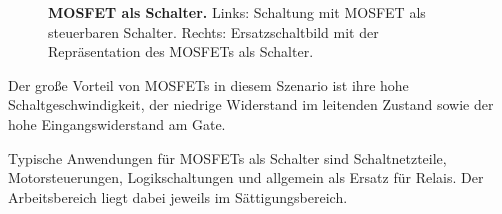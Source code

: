 {\begin{figure}[H]
    \caption{\textbf{MOSFET als Schalter.} Links: Schaltung mit MOSFET als steuerbaren Schalter. 
    Rechts: Ersatzschaltbild mit der Repräsentation des MOSFETs als Schalter.}  
    \label{fig:MOSFETAlsSchalter}
\end{figure}

\begin{Merksatz}{}
    Der große Vorteil von MOSFETs in
diesem Szenario ist ihre hohe Schaltgeschwindigkeit, der niedrige Widerstand im leitenden Zustand
sowie der hohe Eingangswiderstand am Gate. 
\end{Merksatz}


Typische Anwendungen für MOSFETs als Schalter sind Schaltnetzteile, Motorsteuerungen,
Logikschaltungen und allgemein als Ersatz für Relais. Der Arbeitsbereich liegt dabei jeweils im
Sättigungs\-bereich.}






